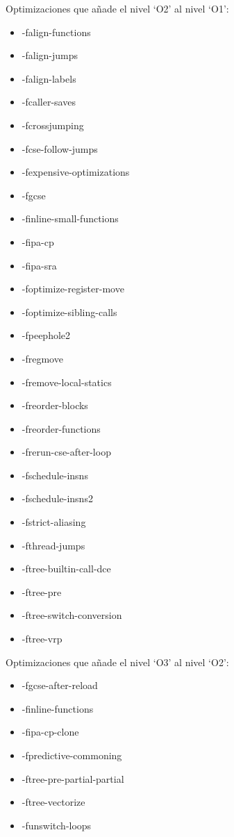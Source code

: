 Optimizaciones que añade el nivel `O2' al nivel `O1':

\begin{multicols}{2}
\begin{itemize}[noitemsep, topsep=0pt, parsep=0pt, partopsep=0pt]
	\item -falign-functions
	\item -falign-jumps
	\item -falign-labels
	\item -fcaller-saves
	\item -fcrossjumping
	\item -fcse-follow-jumps
	\item -fexpensive-optimizations
	\item -fgcse
	\item -finline-small-functions
	\item -fipa-cp
	\item -fipa-sra
	\item -foptimize-register-move
	\item -foptimize-sibling-calls
	\item -fpeephole2
	\item -fregmove
	\item -fremove-local-statics
	\item -freorder-blocks
	\item -freorder-functions
	\item -frerun-cse-after-loop
	\item -fschedule-insns
	\item -fschedule-insns2
	\item -fstrict-aliasing
	\item -fthread-jumps
	\item -ftree-builtin-call-dce
	\item -ftree-pre
	\item -ftree-switch-conversion
	\item -ftree-vrp
\end{itemize}
\end{multicols}

Optimizaciones que añade el nivel `O3' al nivel `O2':

\begin{multicols}{2}
\begin{itemize}[noitemsep, topsep=0pt, parsep=0pt, partopsep=0pt]
	\item -fgcse-after-reload
	\item -finline-functions
	\item -fipa-cp-clone
	\item -fpredictive-commoning
	\item -ftree-pre-partial-partial
	\item -ftree-vectorize
	\item -funswitch-loops
\end{itemize}
\end{multicols}

